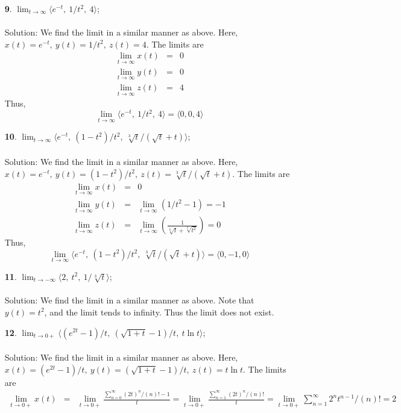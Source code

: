 \documentclass[12pt]{amsbook}
\newcommand{\la}{\langle}
\newcommand{\ra}{\rangle}
\begin{document}
\begin{enumerate}
  \item[{\small\bf 9}.] $\lim_{t \rightarrow \infty}\la e^{-t}, \ 1/t^2, \ 4\ra$;
  \\
  \\
  {\sc Solution}: We find the limit in a similar manner as above. Here, $x(t)=e^{-t}, \ y(t)=1/t^2, \ z(t)=4$. The limits are 
    \begin{eqnarray*}
\lim_{t\rightarrow \infty}x(t)&=&0\\
\lim_{t\rightarrow \infty}y(t)&=&0\\
\lim_{t\rightarrow \infty}z(t)&=&4
  \end{eqnarray*}
  Thus, 
$$\lim_{t \rightarrow \infty}\la e^{-t}, \ 1/t^2, \ 4\ra=\la 0,0,4\ra $$
  \item[{\small\bf 10}.] $\lim_{t \rightarrow \infty}\la e^{-t}, \ (1-t^2)/t^2, \ \sqrt[3]{t}/(\sqrt{t}+t)\ra$;
  \\
  \\
  {\sc Solution}: We find the limit in a similar manner as above. Here, $x(t)=e^{-t}, \ y(t)=(1-t^2)/t^2, \ z(t)=\sqrt[3]{t}/(\sqrt{t}+t)$. The limits are 
    \begin{eqnarray*}
\lim_{t\rightarrow \infty}x(t)&=&0\\
\lim_{t\rightarrow \infty}y(t)&=&\lim_{t\rightarrow \infty}(1/t^2-1)=-1\\
\lim_{t\rightarrow \infty}z(t)&=&\lim_{t\rightarrow \infty}(\frac{1}{\sqrt[6]{t}+\sqrt[3]{t^2}})=0
  \end{eqnarray*}
  Thus, 
$$\lim_{t \rightarrow \infty}\la e^{-t}, \ (1-t^2)/t^2, \ \sqrt[3]{t}/(\sqrt{t}+t)\ra=\la 0,-1,0\ra $$
  \item[{\small\bf 11}.] $\lim_{t \rightarrow -\infty}\la 2, \ t^2, \ 1/\sqrt[3]{t}\ra$;
  \\
  \\
  {\sc Solution}: We find the limit in a similar manner as above. Note that $y(t)=t^2$, and the limit tends to infinity. Thus the limit does not exist.
  \\
  \item[{\small\bf 12}.] $\lim_{t \rightarrow 0+}\la (e^{2t}-1)/t, \ (\sqrt{1+t}-1)/t, \ t\ln t \ra$;
  \\
  \\
  {\sc Solution}: We find the limit in a similar manner as above. Here, $x(t)=(e^{2t}-1)/t, \ y(t)=(\sqrt{1+t}-1)/t, \ z(t)=t\ln t$. The limits are 
    \begin{eqnarray*}
\lim_{t\rightarrow 0+}x(t)&=&\lim_{t\rightarrow 0+}\frac{\sum_{n=0}^{\infty}(2t)^{n}/(n)!-1}{t}=\lim_{t\rightarrow 0+}\frac{\sum_{n=1}^{\infty}(2t)^{n}/(n)!}{t}=\lim_{t\rightarrow 0+}\sum_{n=1}^{\infty}2^nt^{n-1}/(n)!=2\\

\end{eqnarray*}
\end{enumerate}
\end{document}
